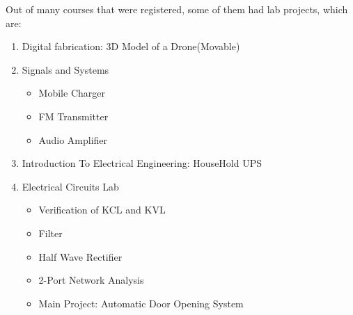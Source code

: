 \documentclass{article}
\begin{document}
Out of many courses that were registered, some of them had lab projects, which are:
\begin{enumerate}
\item Digital fabrication: 3D Model of a Drone(Movable)
\item Signals and Systems
\begin{itemize}
\item Mobile Charger
\item FM Transmitter
\item Audio Amplifier
\end{itemize}
\item Introduction To Electrical Engineering: HouseHold UPS
\item Electrical Circuits Lab
\begin{itemize}
\item Verification of KCL and KVL
\item Filter
\item Half Wave Rectifier
\item 2-Port Network Analysis
\item Main Project: Automatic Door Opening System 
\end{itemize}
\end{enumerate}
\end{document}
